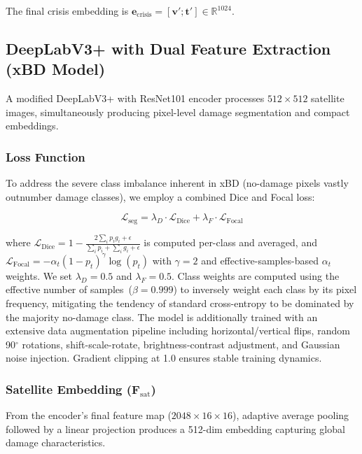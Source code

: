 \documentclass[journal]{IEEEtran}
\begin{document}
The final crisis embedding is $\mathbf{e}_\text{crisis} = [\mathbf{v}'; \mathbf{t}'] \in \mathbb{R}^{1024}$.

\subsection{DeepLabV3+ with Dual Feature Extraction (xBD Model)}

A modified DeepLabV3+ with ResNet101 encoder processes $512 \times 512$ satellite images, simultaneously producing pixel-level damage segmentation and compact embeddings.

\subsubsection{Loss Function}

To address the severe class imbalance inherent in xBD (no-damage pixels vastly outnumber damage classes), we employ a combined Dice and Focal loss:

\begin{equation}
\mathcal{L}_\text{seg} = \lambda_D \cdot \mathcal{L}_\text{Dice} + \lambda_F \cdot \mathcal{L}_\text{Focal}
\end{equation}

where $\mathcal{L}_\text{Dice} = 1 - \frac{2\sum_i p_i g_i + \epsilon}{\sum_i p_i + \sum_i g_i + \epsilon}$ is computed per-class and averaged, and $\mathcal{L}_\text{Focal} = -\alpha_t (1-p_t)^\gamma \log(p_t)$ with $\gamma=2$ and effective-samples-based $\alpha_t$ weights. We set $\lambda_D = 0.5$ and $\lambda_F = 0.5$. Class weights are computed using the effective number of samples~($\beta=0.999$) to inversely weight each class by its pixel frequency, mitigating the tendency of standard cross-entropy to be dominated by the majority no-damage class. The model is additionally trained with an extensive data augmentation pipeline including horizontal/vertical flips, random 90$^\circ$ rotations, shift-scale-rotate, brightness-contrast adjustment, and Gaussian noise injection. Gradient clipping at 1.0 ensures stable training dynamics.

\subsubsection{Satellite Embedding ($\mathbf{F}_\text{sat}$)}

From the encoder's final feature map ($2048 \times 16 \times 16$), adaptive average pooling followed by a linear projection produces a 512-dim embedding capturing global damage characteristics.
\end{document}
